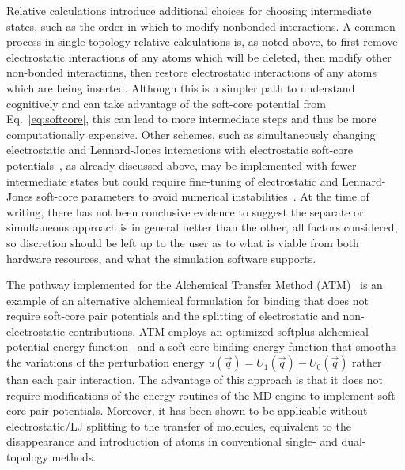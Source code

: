 \documentclass[9pt,bestpractices]{livecoms}
\begin{document}
Relative calculations introduce additional choices for choosing intermediate states, such as the order in which to modify nonbonded interactions.
A common process in single topology relative calculations is, as noted above, to first remove electrostatic interactions of any atoms which will be deleted, then modify other non-bonded interactions, then restore electrostatic interactions of any atoms which are being inserted. Although this is a simpler path to understand cognitively and can take advantage of the soft-core potential from Eq.~\ref{eq:softcore}, this can lead to more intermediate steps and thus be more computationally expensive.
Other schemes, such as simultaneously changing electrostatic and Lennard-Jones interactions with electrostatic soft-core potentials~\cite{steinbrecher2007nonlinear}, as already discussed above, may be implemented with fewer intermediate states but could require fine-tuning of electrostatic and Lennard-Jones soft-core parameters to avoid numerical instabilities~\cite{Tsai_JChemTheoryComput_2023_v19_p640}. 
At the time of writing, there has not been conclusive evidence to suggest the separate or simultaneous approach is in general better than the other, all factors considered, so discretion should be left up to the user as to what is viable from both hardware resources, and what the simulation software supports.

The pathway implemented for the Alchemical Transfer Method (ATM)~\cite{pal2019perturbation,khuttan2021alchemical,wu2021alchemical,azimi2022relative} is an example of an alternative alchemical formulation for binding that does not require soft-core pair potentials and the splitting of electrostatic and non-electrostatic contributions. ATM employs an optimized softplus alchemical potential energy function~\cite{pal2019perturbation} and a soft-core binding energy function that smooths the variations of the perturbation energy $u(\vec{q}) = U_1(\vec{q}) - U_0(\vec{q})$ rather than each pair interaction.\cite{khuttan2021alchemical} The advantage of this approach is that it does not require modifications of the energy routines of the MD engine to implement soft-core pair potentials. Moreover, it has been shown to be applicable without electrostatic/LJ splitting to the transfer of molecules, equivalent to the disappearance and introduction of atoms in conventional single- and dual-topology methods.\cite{khuttan2021alchemical}
\end{document}
